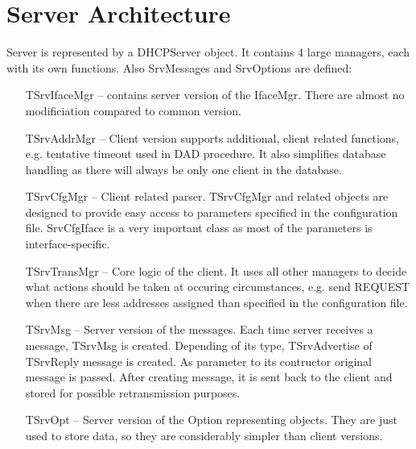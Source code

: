 \section{Server Architecture}

Server is represented by a DHCPServer object. It contains 4 large
managers, each with its own functions. Also SrvMessages and SrvOptions
are defined:
\begin{itemize}
\item[TSrvIfaceMgr] -- contains server version of the IfaceMgr. There
  are almost no modificiation compared to common version.

\item[TSrvAddrMgr] -- Client version supports additional, client
  related functions, e.g. tentative timeout used in DAD procedure. It
  also simplifies database handling as there will always be only one
  client in the database.
\item[TSrvCfgMgr] -- Client related parser. TSrvCfgMgr and related
  objects are designed to provide easy access to parameters specified
  in the configuration file. SrvCfgIface is a very important class as
  most of the parameters is interface-specific.
\item[TSrvTransMgr] -- Core logic of the client. It uses all other
  managers to decide what actions should be taken at occuring
  circumstances, e.g. send REQUEST when there are less addresses
  assigned than specified in the configuration file.
\item[TSrvMsg] -- Server version of the messages. Each time server
  receives a message, TSrvMsg is created. Depending of its type,
  TSrvAdvertise of TSrvReply message is created. As parameter to its
  contructor original message is passed. After creating message, it is
  sent back to the client and stored for possible retransmission
  purposes.
\item[TSrvOpt] -- Server version of the Option representing
  objects. They are just used to store data, so they are considerably
  simpler than client versions.
\end{itemize}

